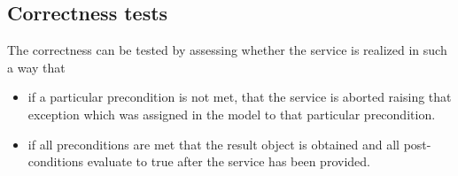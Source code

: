 \subsection{Correctness tests}

The correctness can be tested by assessing whether the service is realized in such a way that
\begin{itemize}
  \item if a particular precondition is not met, that the service is aborted raising that exception which was assigned in the model to that particular precondition.
  \item if all preconditions are met that the result object is obtained and all post-conditions evaluate to true after the service has been provided.
\end{itemize}

% 



